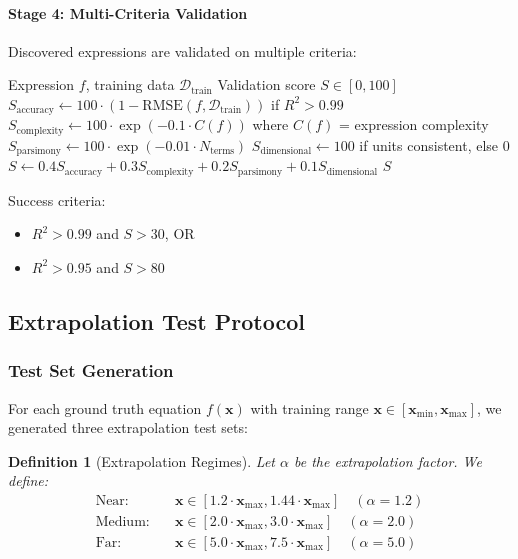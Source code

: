 \documentclass[twoside,11pt]{article}
\newtheorem{definition}{Definition}
\begin{document}
\paragraph{Stage 4: Multi-Criteria Validation}

Discovered expressions are validated on multiple criteria:

\begin{algorithm}[htbp]
\caption{Multi-Criteria Expression Validation}
\begin{algorithmic}[1]
\REQUIRE Expression $f$, training data $\mathcal{D}_{\text{train}}$
\ENSURE Validation score $S \in [0, 100]$
\STATE $S_{\text{accuracy}} \gets 100 \cdot (1 - \text{RMSE}(f, \mathcal{D}_{\text{train}}))$ if $R^2 > 0.99$
\STATE $S_{\text{complexity}} \gets 100 \cdot \exp(-0.1 \cdot C(f))$ where $C(f)$ = expression complexity
\STATE $S_{\text{parsimony}} \gets 100 \cdot \exp(-0.01 \cdot N_{\text{terms}})$
\STATE $S_{\text{dimensional}} \gets 100$ if units consistent, else $0$
\STATE $S \gets 0.4 S_{\text{accuracy}} + 0.3 S_{\text{complexity}} + 0.2 S_{\text{parsimony}} + 0.1 S_{\text{dimensional}}$
\RETURN $S$
\end{algorithmic}
\end{algorithm}

Success criteria:
\begin{itemize}
    \item $R^2 > 0.99$ and $S > 30$, OR
    \item $R^2 > 0.95$ and $S > 80$
\end{itemize}

\subsection{Extrapolation Test Protocol}
\label{sec:extrapolation_protocol}

\subsubsection{Test Set Generation}

For each ground truth equation $f(\mathbf{x})$ with training range $\mathbf{x} \in [\mathbf{x}_{\min}, \mathbf{x}_{\max}]$, we generated three extrapolation test sets:

\begin{definition}[Extrapolation Regimes]
Let $\alpha$ be the extrapolation factor. We define:
\begin{align}
\text{Near:} \quad &\mathbf{x} \in [1.2 \cdot \mathbf{x}_{\max}, 1.44 \cdot \mathbf{x}_{\max}] \quad (\alpha = 1.2) \\
\text{Medium:} \quad &\mathbf{x} \in [2.0 \cdot \mathbf{x}_{\max}, 3.0 \cdot \mathbf{x}_{\max}] \quad (\alpha = 2.0) \\
\text{Far:} \quad &\mathbf{x} \in [5.0 \cdot \mathbf{x}_{\max}, 7.5 \cdot \mathbf{x}_{\max}] \quad (\alpha = 5.0)
\end{align}
\end{definition}
\end{document}

